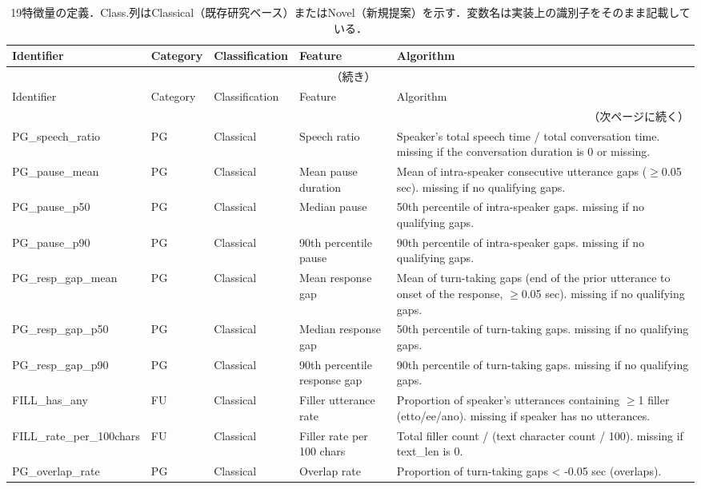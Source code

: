 {\footnotesize
\setlength{\tabcolsep}{4pt}
\begin{longtable}{lllp{1.9cm}p{3.6cm}}
\caption{19特徴量の定義．Class.列はClassical（既存研究ベース）またはNovel（新規提案）を示す．変数名は実装上の識別子をそのまま記載している．}
\label{tab:feature_def}\\
\toprule
Identifier & Category & Classification & Feature & Algorithm \\
\midrule
\endfirsthead
\multicolumn{5}{c}{\tablename~\thetable{}（続き）}\\
\toprule
Identifier & Category & Classification & Feature & Algorithm \\
\midrule
\endhead
\midrule
\multicolumn{5}{r}{（次ページに続く）}\\
\endfoot
\bottomrule
\endlastfoot
PG\_speech\_ratio & PG & Classical & Speech ratio & Speaker's total speech time / total conversation time. missing if the conversation duration is 0 or missing. \\
PG\_pause\_mean & PG & Classical & Mean pause duration & Mean of intra-speaker consecutive utterance gaps ($\geq$0.05 sec). missing if no qualifying gaps. \\
PG\_pause\_p50 & PG & Classical & Median pause & 50th percentile of intra-speaker gaps. missing if no qualifying gaps. \\
PG\_pause\_p90 & PG & Classical & 90th percentile pause & 90th percentile of intra-speaker gaps. missing if no qualifying gaps. \\
PG\_resp\_gap\_mean & PG & Classical & Mean response gap & Mean of turn-taking gaps (end of the prior utterance to onset of the response, $\geq$0.05 sec). missing if no qualifying gaps. \\
PG\_resp\_gap\_p50 & PG & Classical & Median response gap & 50th percentile of turn-taking gaps. missing if no qualifying gaps. \\
PG\_resp\_gap\_p90 & PG & Classical & 90th percentile response gap & 90th percentile of turn-taking gaps. missing if no qualifying gaps. \\
FILL\_has\_any & FU & Classical & Filler utterance rate & Proportion of speaker's utterances containing $\geq$1 filler (etto/ee/ano). missing if speaker has no utterances. \\
FILL\_rate\_per\_100chars & FU & Classical & Filler rate per 100 chars & Total filler count / (text character count / 100). missing if text\_len is 0. \\
PG\_overlap\_rate & PG & Classical & Overlap rate & Proportion of turn-taking gaps < -0.05 sec (overlaps). \\

\end{longtable}}
